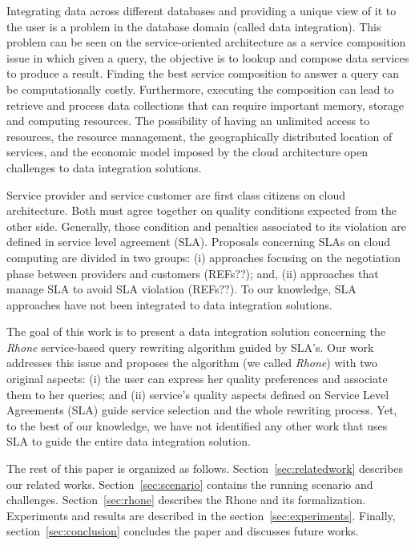 Integrating data across different databases and providing a unique view of it to the user is a problem in the database domain (called data integration).
This problem can be seen on the service-oriented architecture as a service composition issue in which given a query, the objective is to lookup and compose data services to produce a result. 
% 	
Finding the best service composition to answer a query can be computationally costly. 
Furthermore, executing the composition can lead to retrieve and process data collections that can require important memory, storage and computing resources.
The possibility of having an unlimited access to resources, the resource management, the geographically distributed location of services, and the economic model imposed by the cloud architecture open challenges to data integration solutions.

Service provider and service customer are first class citizens on cloud architecture.
Both must agree together on quality conditions expected from the other side. 
Generally, those condition and penalties associated to its violation are defined in service level 
agreement (SLA). 
Proposals concerning SLAs on cloud computing are divided in two groups: (i)
approaches focusing on the negotiation phase between providers and customers
(REFs??); and, (ii) approaches that manage SLA to avoid SLA violation (REFs??).
To our knowledge, SLA approaches have not been integrated to data integration solutions.

The goal of this work is to present a data integration solution
concerning the \textit{Rhone} service-based query rewriting algorithm guided by SLA's.
Our work addresses this issue and proposes the algorithm (we
called \textit{Rhone}) with two original aspects: (i) the user can express her
quality preferences and associate them to her queries; and (ii)  service's quality aspects defined on Service Level Agreements (SLA) guide service selection and the whole rewriting process.
Yet, to the best of our knowledge, we have not identified any other work that uses SLA to guide the entire data integration solution.

The rest of this paper is organized as follows. 
Section~\ref{sec:relatedwork} describes our related works. 
Section~\ref{sec:scenario} contains the running scenario and challenges.
Section~\ref{sec:rhone} describes the Rhone and its formalization. 
Experiments and results are described in the section~\ref{sec:experiments}. 
Finally, section~\ref{sec:conclusion} concludes the paper and discusses future works.
